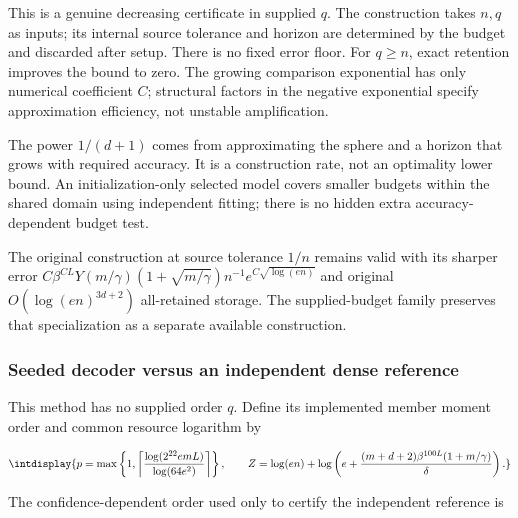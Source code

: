 
This is a genuine decreasing certificate in supplied \(q\). The construction takes \(n,\allowbreak q\) as inputs; its internal source tolerance and horizon are determined by the budget and discarded after setup. There is no fixed error floor. For \(q\ge n\), exact retention improves the bound to zero. The growing comparison exponential has only numerical coefficient \(C\); structural factors in the negative exponential specify approximation efficiency, not unstable amplification.



The power \(1/(d+1)\) comes from approximating the sphere and a horizon that grows with required accuracy. It is a construction rate, not an optimality lower bound. An initialization-only selected model covers smaller budgets within the shared domain using independent fitting; there is no hidden extra accuracy-dependent budget test.



The original construction at source tolerance \(1/n\) remains valid with its sharper error \(C\beta^{CL}Y(m/\gamma)(1+\sqrt{m/\gamma}) n^{-1}e^{C\sqrt{\log(en)}}\) and original \(O(\log(en)^{3d+2})\) all-retained storage. The supplied-budget family preserves that specialization as a separate available construction.


\subsubsection{Seeded decoder versus an independent dense reference}
\label{int:seeded-forward-interface}


This method has no supplied order \(q\). Define its implemented member moment order and common resource logarithm by


\begingroup\renewcommand{\theHequation}{intdisplay.10}
\begin{equation}
\intdisplay{
p=\max\left\{1,\left\lceil
\frac{\log(2^{22}emL)}{\log(64e^2)}
\right\rceil\right\},
\qquad
Z=\log(en)+\log\left(e+
\frac{(m+d+2)\beta^{100L}(1+m/\gamma)}\delta\right).
}
\label{int:eq-0007-seeded-decoder-orders}
\end{equation}
\endgroup


The confidence-dependent order used only to certify the independent reference is


